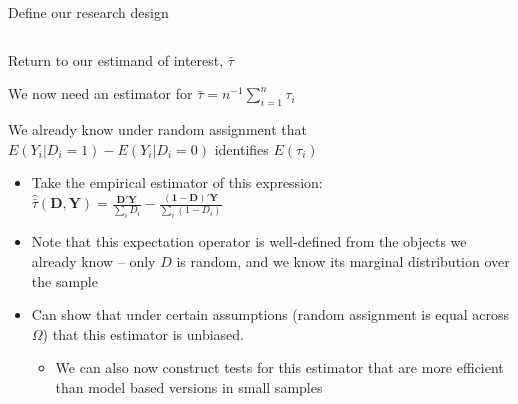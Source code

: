 \documentclass[notes,11pt, aspectratio=169]{beamer}
\newenvironment{wideitemize}{\itemize\addtolength{\itemsep}{10pt}}{\enditemize}
\begin{document}
\begin{frame}{Define our research design}
\begin{columns}[T]
\begin{column}{.4\textwidth}
  \end{column}%
\end{columns}
\end{frame}

\begin{frame}{Return to our estimand of interest, $\bar{\tau}$}
  \begin{wideitemize}
  \item We now need an estimator for $\bar{\tau} = n^{-1}\sum_{i=1}^{n}\tau_{i}$
  \item We already know under random assignment that $E(Y_{i}| D_{i} = 1) - E(Y_{i} | D_{i} = 0)$ identifies $E(\tau_{i})$
    \begin{itemize}
    \item Take the empirical estimator of this expression: $\hat{\bar{\tau}}(\mathbf{D}, \mathbf{Y}) = \frac{\mathbf{D}'\mathbf{Y}}{\sum_{i}D_{i}} - \frac{(\mathbf{1}-\mathbf{D})'\mathbf{Y}}{\sum_{i}(1-D_{i})}$
    \item Note that this expectation operator is well-defined from the
      objects we already know -- only $D$ is random, and we know its
      marginal distribution over the sample
    \item Can show that under certain assumptions (random assignment
      is equal across $\Omega$) that this estimator is unbiased.
      \begin{itemize}
      \item We can also now construct tests for this
        estimator that are more efficient than model based versions in small samples
      \end{itemize}
    \end{itemize}
  \end{wideitemize}
\end{frame}
\end{document}
